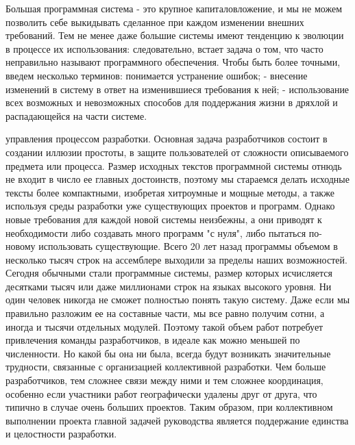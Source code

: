 \documentclass[11pt]{article}
\begin{document}
\par
Большая программная система - это крупное капиталовложение, и мы не можем позволить себе выкидывать сделанное при каждом изменении внешних требований. Тем не менее даже большие системы имеют тенденцию к эволюции в процессе их использования: следовательно, встает задача о том, что часто неправильно называют { программного обеспечения}. Чтобы быть более точными, введем несколько терминов: 
{\itemize
{} понимается устранение ошибок;
 - внесение изменений в систему в ответ на изменившиеся требования к ней;
 - использование всех возможных и невозможных способов для поддержания жизни в дряхлой и распадающейся на части системе.}
\par
{ управления процессом разработки.} Основная задача разработчиков состоит в создании иллюзии простоты, в защите пользователей от сложности описываемого предмета или процесса. Размер исходных текстов программной системы отнюдь не входит в число ее главных достоинств, поэтому мы стараемся делать исходные тексты более компактными, изобретая хитроумные и мощные методы, а также используя среды разработки уже существующих проектов и программ. Однако новые требования для каждой новой системы неизбежны, а они приводят к необходимости либо создавать много программ "с нуля", либо пытаться по-новому использовать существующие. Всего 20 лет назад программы объемом в несколько тысяч строк на ассемблере выходили за пределы наших возможностей. Сегодня обычными стали программные системы, размер которых исчисляется десятками тысяч или даже миллионами строк на языках высокого уровня. Ни один человек никогда не сможет полностью понять такую систему. Даже если мы правильно разложим ее на составные части, мы все равно получим сотни, а иногда и тысячи отдельных модулей. Поэтому такой объем работ потребует привлечения команды разработчиков, в идеале как можно меньшей по численности. Но какой бы она ни была, всегда будут возникать значительные трудности, связанные с организацией коллективной разработки. Чем больше разработчиков, тем сложнее связи между ними и тем сложнее координация, особенно если участники работ географически удалены друг от друга, что типично в случае очень больших проектов. Таким образом, при коллективном выполнении проекта главной задачей руководства является поддержание единства и целостности разработки.
\par
\end{document}
